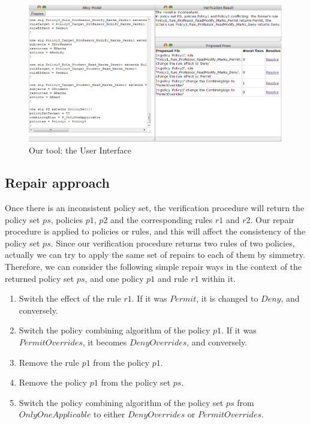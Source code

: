 \documentclass{acm_proc_article-sp}
\begin{document}
\begin{figure}[ht]
\includegraphics[width=\textwidth]{tool.png}
\caption{Our tool: the User Interface}    
  \label{fig:tool}
\end{figure}

\subsection{Repair approach}

Once there is an inconsistent policy set, the verification procedure will return the policy set $ps$, policies $p1$, $p2$ and the corresponding rules $r1$ and $r2$. Our repair procedure is applied to policies or rules, and this will affect the consistency of the policy set $ps$. Since our verification procedure returns two rules of two policies, actually we can try to apply the same set of repairs to each of them by simmetry. Therefore, we can consider the following simple repair ways in the context of the returned policy set $ps$, and one policy $p1$ and rule $r1$ within it.

\begin{enumerate}
\item Switch the effect of the rule $r1$. If it was $Permit$, it is changed to $Deny$, and conversely.
\item Switch the policy combining algorithm of the policy $p1$. If it was $PermitOverrides$, it becomes $DenyOverrides$, and conversely.
\item Remove the rule $p1$ from the policy $p1$.
\item Remove the policy $p1$ from the policy set $ps$.
\item Switch the policy combining algorithm of the policy set $ps$ from $OnlyOneApplicable$ to either $DenyOverrides$ or $PermitOverrides$.
\end{enumerate}
\end{document}
